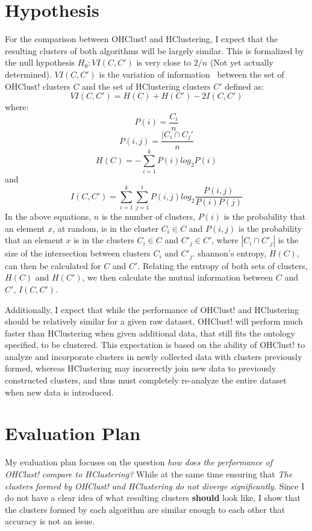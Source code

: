 \documentclass[12pt]{ucthesis}
\begin{document}
   \section{Hypothesis}\label{sec:eval_goals}
      For the comparison between OHClust! and HClustering, I expect that the
      resulting clusters of both algorithms will be largely similar. This is
      formalized by the null hypothesis $H_0: VI(C, C')$ is very close to $2/n$
      (Not yet actually determined). $VI(C, C')$ is the variation of
      information~\cite{Halkidi:Validation} between the set of OHClust!
      clusters $C$ and the set of HClustering clusters $C'$ defined as:
      $$VI(C, C') = H(C) + H(C') - 2I(C, C')$$
      where:
      $$P(i) = \frac{C_i}{n}$$
      $$P(i,j) = \frac{| C_i \cap C_j'}{n}$$
      $$H(C) = -\sum_{i=1}^{k}P(i)log_2P(i)$$
      and
      $$I(C, C') = \sum_{i=1}^{k}\sum_{j=1}^{t}P(i,j)log_2\frac{P(i,j)}{P(i)P(j)}$$
      In the above equations, $n$ is the number of clusters, $P(i)$ is the
      probability that an element $x$, at random, is in the cluster $C_i \in C$
      and $P(i, j)$ is the probability that an element $x$ is in the clusters
      $C_i \in C$ and $C'_j \in C'$, where $|C_i \cap C'_j|$ is the size of the
      intersection between clusters $C_i$ and $C'_j$.  shannon's entropy,
      $H(C)$, can then be calculated for $C$ and $C'$.  Relating the entropy of
      both sets of clusters, $H(C)$ and $H(C')$, we then calculate the mutual
      information between $C$ and $C'$, $I(C, C')$.

      Additionally, I expect that while the performance of OHClust! and
      HClustering should be relatively similar for a given raw dataset,
      OHClust! will perform much faster than HClustering when given additional
      data, that still fits the ontology specified, to be clustered. This
      expectation is based on the ability of OHClust! to analyze and
      incorporate clusters in newly collected data with clusters previously
      formed, whereas HClustering may incorrectly join new data to previously
      constructed clusters, and thus must completely re-analyze the entire
      dataset when new data is introduced.

   \section{Evaluation Plan}\label{sec:eval_plan}
      My evaluation plan focuses on the question \textit{how does the performance of
      OHClust! compare to HClustering?} While at the
      same time ensuring that \textit{The clusters formed by OHClust! and
      HClustering do not diverge significantly.} Since I do not
      have a clear idea of what resulting clusters \textbf{should} look like, I
      show that the clusters formed by each algorithm are similar enough to
      each other that accuracy is not an issue.
\end{document}
